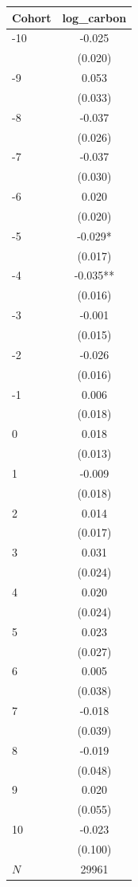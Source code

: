 {
\def\sym#1{\ifmmode^{#1}\else\(^{#1}\)\fi}
\begin{tabular}{l*{1}{c}}
\toprule
Cohort    &log\_carbon   \\
\midrule
-10       &   -0.025   \\
          &  (0.020)   \\
-9        &    0.053   \\
          &  (0.033)   \\
-8        &   -0.037   \\
          &  (0.026)   \\
-7        &   -0.037   \\
          &  (0.030)   \\
-6        &    0.020   \\
          &  (0.020)   \\
-5        &   -0.029*  \\
          &  (0.017)   \\
-4        &   -0.035** \\
          &  (0.016)   \\
-3        &   -0.001   \\
          &  (0.015)   \\
-2        &   -0.026   \\
          &  (0.016)   \\
-1        &    0.006   \\
          &  (0.018)   \\
0         &    0.018   \\
          &  (0.013)   \\
1         &   -0.009   \\
          &  (0.018)   \\
2         &    0.014   \\
          &  (0.017)   \\
3         &    0.031   \\
          &  (0.024)   \\
4         &    0.020   \\
          &  (0.024)   \\
5         &    0.023   \\
          &  (0.027)   \\
6         &    0.005   \\
          &  (0.038)   \\
7         &   -0.018   \\
          &  (0.039)   \\
8         &   -0.019   \\
          &  (0.048)   \\
9         &    0.020   \\
          &  (0.055)   \\
10        &   -0.023   \\
          &  (0.100)   \\
\midrule
\(N\)     &    29961   \\
\bottomrule
\end{tabular}
}
